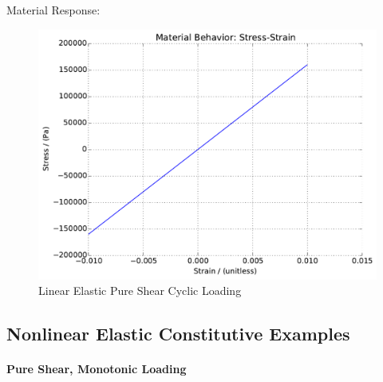 \documentclass[fleqn,11pt]{article}
\begin{document}
Material Response:
\begin{figure}[H]
\begin{center}
\includegraphics[width=12cm]{../fei_examples/2_1_linear_elastic/2pure_shear_cyclic_loading/result.pdf}
\caption{
\label{linear_elastic_shear_mono}
Linear Elastic Pure Shear Cyclic Loading}
\end{center}
\end{figure}


\newpage
\subsection{Nonlinear Elastic Constitutive Examples}

\paragraph{Pure Shear, Monotonic Loading} ~

% 

\end{document}
